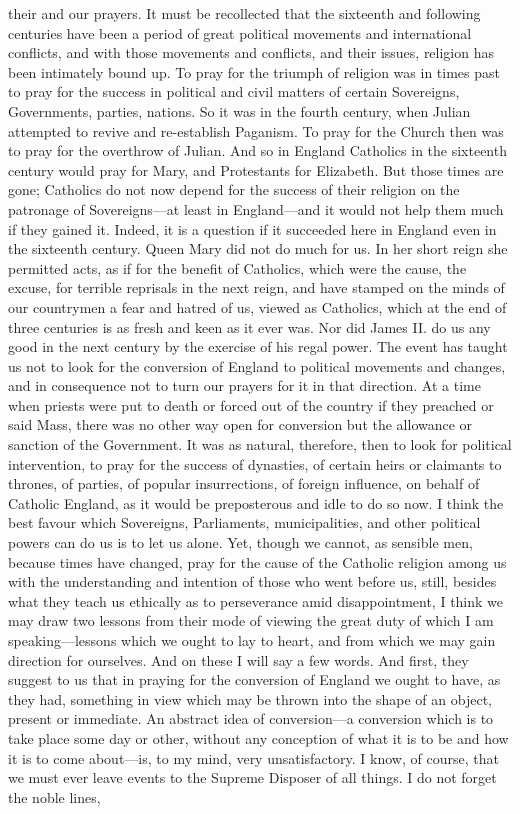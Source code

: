 their and our prayers. It must be recollected that the sixteenth and
following centuries have been a period of great political movements
and international conflicts, and with those movements and conflicts,
and their issues, religion has been intimately bound up. To pray for
the triumph of religion was in times past to pray for the success in
political and civil matters of certain Sovereigns, Governments,
parties, nations. So it was in the fourth century, when Julian
attempted to revive and re-establish Paganism. To pray for the Church
then was to pray for the overthrow of Julian. And so in England
Catholics in the sixteenth century would pray for Mary, and
Protestants for Elizabeth. But those times are gone; Catholics do not
now depend for the success of their religion on the patronage of
Sovereigns—at least in England—and it would not help them much if
they gained it. Indeed, it is a question if it succeeded here in
England even in the sixteenth century. Queen Mary did not do much for
us. In her short reign she permitted acts, as if for the benefit of
Catholics, which were the cause, the excuse, for terrible reprisals in
the next reign, and have stamped on the minds of our countrymen a fear
and hatred of us, viewed as Catholics, which at the end of three
centuries is as fresh and keen as it ever was. Nor did James II. do us
any good in the next century by the exercise of his regal power. The
event has taught us not to look for the conversion of England to
political movements and changes, and in consequence not to turn our
prayers for it in that direction. At a time when priests were put to
death or forced out of the country if they preached or said Mass,
there was no other way open for conversion but the allowance or
sanction of the Government. It was as natural, therefore, then
to look for political intervention, to pray for the success of
dynasties, of certain heirs or claimants to thrones, of parties, of
popular insurrections, of foreign influence, on behalf of Catholic
England, as it would be preposterous and idle to do so now. I think
the best favour which Sovereigns, Parliaments, municipalities, and
other political powers can do us is to let us alone. Yet, though we
cannot, as sensible men, because times have changed, pray for the
cause of the Catholic religion among us with the understanding and
intention of those who went before us, still, besides what they teach
us ethically as to perseverance amid disappointment, I think we may
draw two lessons from their mode of viewing the great duty of which I
am speaking—lessons which we ought to lay to heart, and from which
we may gain direction for ourselves. And on these I will say a few
words. And first, they suggest to us that in praying for the
conversion of England we ought to have, as they had, something in view
which may be thrown into the shape of an object, present or immediate.
An abstract idea of conversion—a conversion which is to take place
some day or other, without any conception of what it is to be and how
it is to come about—is, to my mind, very unsatisfactory. I know, of
course, that we must ever leave events to the Supreme Disposer of all
things. I do not forget the noble lines,

